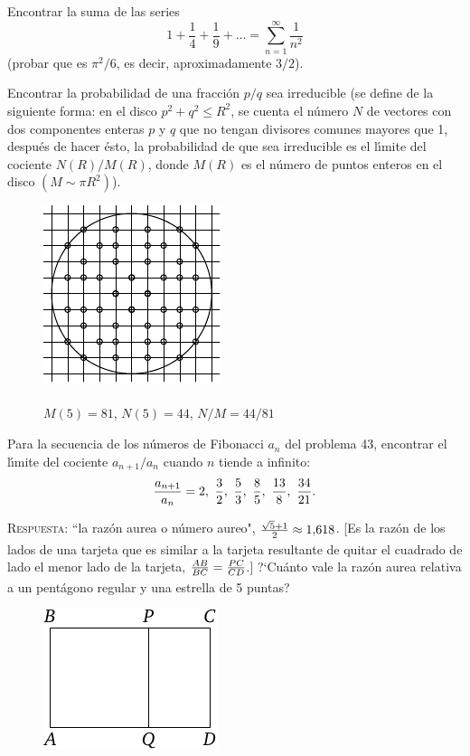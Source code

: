 \documentclass[12pt]{article}  %
\begin{document}
\bigskip
{} Encontrar la suma de las series
$$
1+ \frac{1}{4}+ \frac{1}{9}+\dots=\textstyle\sum\limits_{n=1}^{\infty} \frac{1}{n^2}
$$
(probar que es $\pi^2/6$, es decir, aproximadamente $3/2$). 

\newpage
{} Encontrar la probabilidad de una fracci\'on $p/q$ sea irreducible (se define de la siguiente forma:
en el disco $p^2+q^2 \leqslant R^2$, se cuenta el n\'umero $N$ de vectores con dos componentes enteras $p$ y $q$ que no tengan divisores comunes mayores que 1, despu\'es de hacer \'esto, la probabilidad de que sea irreducible es el l\'{\i}mite del cociente $N(R)/M(R)$, donde $M(R)$ es el n\'umero de puntos enteros en el disco $(M \sim \pi R^2)$).
\begin{figure}[h]
\footnotesize
\centering
\includegraphics{taskbook-36}\\{\ } \\
$M(5)=81$, $N(5)=44$, $N/M = 44/81$
\end{figure}

\bigskip
{} Para la secuencia de los n\'umeros de Fibonacci $a_n$ del problema 43, encontrar el l\'{\i}mite del cociente 
$a_{n+1}/a_n$ cuando $n$ tiende a infinito:\vspace{2\jot}
\[
\frac{a_{n+1}}{a_n}=2,\ \frac 32,\ \frac53, \ \frac85, \ \frac{13}8,
\ \frac{34}{21}.
\vspace{\jot}
\] 

\textsc{Respuesta:} ``la raz\'on aurea o n\'umero aureo",
$\frac{\sqrt{5}+1}{2\vphantom)} \approx 1{,}618$. [Es la raz\'on de los lados de una tarjeta que es similar a la tarjeta resultante de quitar el cuadrado de lado el menor lado de la tarjeta,
  $\frac{AB}{BC}=\frac{PC}{CD\vphantom)}$.] ?`Cu\'anto vale la raz\'on aurea relativa a un pent\'agono regular y una estrella de 5 puntas? 

\begin{figure}[h]
\centering
\includegraphics{taskbook-37}
\end{figure}
\end{document}
